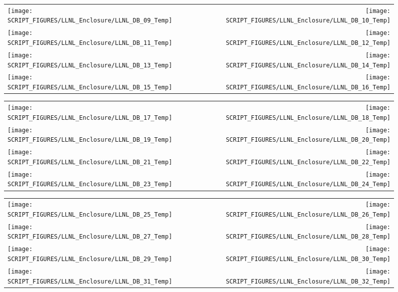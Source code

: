 \begin{figure}[!ht]
\begin{tabular*}{\textwidth}{l@{\extracolsep{\fill}}r}
\texttt{[image: SCRIPT\_FIGURES/LLNL\_Enclosure/LLNL\_DB\_09\_Temp]} &
\texttt{[image: SCRIPT\_FIGURES/LLNL\_Enclosure/LLNL\_DB\_10\_Temp]} \\
\texttt{[image: SCRIPT\_FIGURES/LLNL\_Enclosure/LLNL\_DB\_11\_Temp]} &
\texttt{[image: SCRIPT\_FIGURES/LLNL\_Enclosure/LLNL\_DB\_12\_Temp]} \\
\texttt{[image: SCRIPT\_FIGURES/LLNL\_Enclosure/LLNL\_DB\_13\_Temp]} &
\texttt{[image: SCRIPT\_FIGURES/LLNL\_Enclosure/LLNL\_DB\_14\_Temp]} \\
\texttt{[image: SCRIPT\_FIGURES/LLNL\_Enclosure/LLNL\_DB\_15\_Temp]} &
\texttt{[image: SCRIPT\_FIGURES/LLNL\_Enclosure/LLNL\_DB\_16\_Temp]}
\end{tabular*}
\end{figure}

\begin{figure}[!ht]
\begin{tabular*}{\textwidth}{l@{\extracolsep{\fill}}r}
\texttt{[image: SCRIPT\_FIGURES/LLNL\_Enclosure/LLNL\_DB\_17\_Temp]} &
\texttt{[image: SCRIPT\_FIGURES/LLNL\_Enclosure/LLNL\_DB\_18\_Temp]} \\
\texttt{[image: SCRIPT\_FIGURES/LLNL\_Enclosure/LLNL\_DB\_19\_Temp]} &
\texttt{[image: SCRIPT\_FIGURES/LLNL\_Enclosure/LLNL\_DB\_20\_Temp]} \\
\texttt{[image: SCRIPT\_FIGURES/LLNL\_Enclosure/LLNL\_DB\_21\_Temp]} &
\texttt{[image: SCRIPT\_FIGURES/LLNL\_Enclosure/LLNL\_DB\_22\_Temp]} \\
\texttt{[image: SCRIPT\_FIGURES/LLNL\_Enclosure/LLNL\_DB\_23\_Temp]} &
\texttt{[image: SCRIPT\_FIGURES/LLNL\_Enclosure/LLNL\_DB\_24\_Temp]}
\end{tabular*}
\end{figure}

\begin{figure}[!ht]
\begin{tabular*}{\textwidth}{l@{\extracolsep{\fill}}r}
\texttt{[image: SCRIPT\_FIGURES/LLNL\_Enclosure/LLNL\_DB\_25\_Temp]} &
\texttt{[image: SCRIPT\_FIGURES/LLNL\_Enclosure/LLNL\_DB\_26\_Temp]} \\
\texttt{[image: SCRIPT\_FIGURES/LLNL\_Enclosure/LLNL\_DB\_27\_Temp]} &
\texttt{[image: SCRIPT\_FIGURES/LLNL\_Enclosure/LLNL\_DB\_28\_Temp]} \\
\texttt{[image: SCRIPT\_FIGURES/LLNL\_Enclosure/LLNL\_DB\_29\_Temp]} &
\texttt{[image: SCRIPT\_FIGURES/LLNL\_Enclosure/LLNL\_DB\_30\_Temp]} \\
\texttt{[image: SCRIPT\_FIGURES/LLNL\_Enclosure/LLNL\_DB\_31\_Temp]} &
\texttt{[image: SCRIPT\_FIGURES/LLNL\_Enclosure/LLNL\_DB\_32\_Temp]}
\end{tabular*}
\end{figure}

